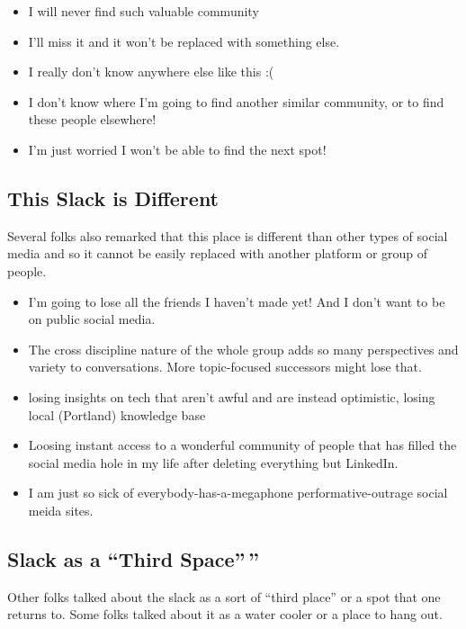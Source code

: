 \documentclass[
]{book}
\providecommand{\tightlist}{%
  \setlength{\itemsep}{0pt}\setlength{\parskip}{0pt}}
\begin{document}
\begin{itemize}
\tightlist
\item
  I will never find such valuable community
\item
  I'll miss it and it won't be replaced with something else.
\item
  I really don't know anywhere else like this :(
\item
  I don't know where I'm going to find another similar community, or to find these people elsewhere!
\item
  I'm just worried I won't be able to find the next spot!
\end{itemize}

\subsection{This Slack is Different}\label{this-slack-is-different}

Several folks also remarked that this place is different than other types of social media and so it cannot be easily replaced with another platform or group of people.

\begin{itemize}
\tightlist
\item
  I'm going to lose all the friends I haven't made yet! And I don't want to be on public social media.
\item
  The cross discipline nature of the whole group adds so many perspectives and variety to conversations. More topic-focused successors might lose that.
\item
  losing insights on tech that aren't awful and are instead optimistic, losing local (Portland) knowledge base
\item
  Loosing instant access to a wonderful community of people that has filled the social media hole in my life after deleting everything but LinkedIn.
\item
  I am just so sick of everybody-has-a-megaphone performative-outrage social meida sites.
\end{itemize}

\subsection{Slack as a ``Third Space''\,''}\label{slack-as-a-third-space}

Other folks talked about the slack as a sort of ``third place'' or a spot that one returns to. Some folks talked about it as a water cooler or a place to hang out.
\end{document}
